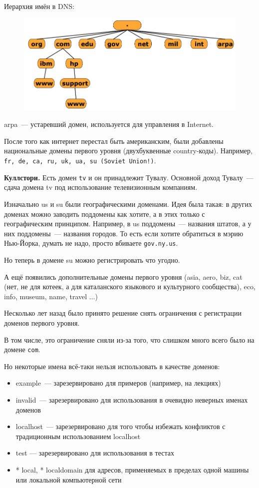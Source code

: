 Иерархия имён в DNS:

\begin{figure}[H]
  \centering
  \includegraphics[width=15cm]{images/05/01}
\end{figure}

arpa~--- устаревший домен, используется для управления в Internet.

После того как интернет перестал быть американским, были добавлены национальные домены первого уровня (двухбуквенные country-коды). Например, {\tt fr, de, ca, ru, uk, ua, su (Soviet Union!)}.

{\bf Куллстори.} Есть домен {\tt tv} и он принадлежит Тувалу. Основной доход Тувалу~--- сдача домена tv под использование телевизионным компаниям.

Изначально us и su были географическими доменами. Идея была такая: в других доменах можно заводить поддомены как хотите, а в этих только с географическим принципом. Например, в us поддомены~--- названия штатов, а у них поддомены~--- названия городов. То есть если хотите обратиться в мэрию Нью-Йорка, думать не надо, просто вбиваете {\tt gov.ny.us}.

Но теперь в домене su можно регистрировать что угодно.

А ещё появились дополнительные домены первого уровня (asia, aero, biz, cat (нет, не для котеек, а для каталанского языкового и культурного сообщества), eco, info, museum, name, travel ...)

Несколько лет назад было принято решение снять ограничения с регистрации доменов первого уровня.

В том числе, это ограничение сняли из-за того, что слишком много всего было на домене {\tt com}.

Но некоторые имена всё-таки нельзя использовать в качестве доменов:
\begin{itemize}
    \item example~--- зарезервировано для примеров (например, на лекциях) 
    \item invalid~--- зарезервировано для использования в очевидно неверных именах доменов 
    \item localhost~--- зарезервировано для того чтобы избежать конфликтов с традиционным использованием localhost
    \item test — зарезервировано для использования в тестах
    \item * local, * localdomain для адресов, применяемых в пределах одной машины или локальной компьютерной сети
\end{itemize}

